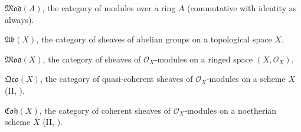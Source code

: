 { $\mathfrak{Mod}(A)$, the category of modules over a ring $A$ (commutative with identity as always).

 $\mathfrak{Ab}(X)$, the category of sheaves of abelian groups on a topological space $X$.

 $\mathfrak{Mod}(X)$, the category of sheaves of $\mathcal O_X$-modules on a ringed space $(X,\mathcal O_X)$.

 $\mathfrak{Qco}(X)$, the category of quasi-coherent sheaves of $\mathcal O_X$-modules on a scheme $X$ (II, ).

 $\mathfrak{Coh}(X)$, the category of coherent sheaves of $\mathcal O_X$-modules on a noetherian scheme $X$ (II, ).
}
